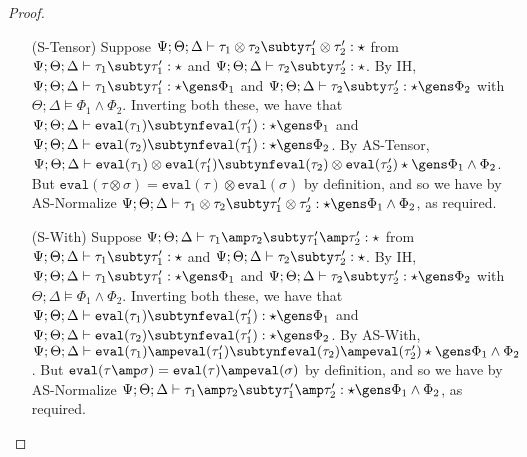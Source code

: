 \begin{proof}
\begin{itemize}
   \item[(S-Tensor)] Suppose $\Psi ; \Theta ; \Delta \vdash \tau_1 \otimes \tau_2 \subty \tau_1' \otimes \tau_2' : \star$ from $\Psi ; \Theta ; \Delta \vdash \tau_1 \subty \tau_1' : \star$ and $\Psi ; \Theta ; \Delta \vdash \tau_2 \subty \tau_2' : \star$. By IH, $\Psi ; \Theta ; \Delta \vdash \tau_1 \subty \tau_1' : \star \gens \Phi_1$ and $\Psi ; \Theta ; \Delta \vdash \tau_2 \subty \tau_2' : \star \gens \Phi_2$ with $\Theta ; \Delta \vDash \Phi_1 \wedge \Phi_2$. Inverting both these, we have that $\Psi ; \Theta ; \Delta \vdash \texttt{eval}(\tau_1) \subtynf \texttt{eval}(\tau_1') : \star \gens \Phi_1$ and $\Psi ; \Theta ; \Delta \vdash \texttt{eval}(\tau_2) \subtynf \texttt{eval}(\tau_1') : \star \gens \Phi_2$. By AS-Tensor, $\Psi ; \Theta ; \Delta \vdash \texttt{eval}(\tau_1) \otimes \texttt{eval}(\tau_1') \subtynf \texttt{eval}(\tau_2) \otimes \texttt{eval}(\tau_2') \star \gens \Phi_1 \wedge \Phi_2$. But $\texttt{eval}(\tau \otimes \sigma) = \texttt{eval}(\tau)\otimes\texttt{eval}(\sigma)$ by definition, and so we have by AS-Normalize $\Psi ; \Theta ; \Delta \vdash \tau_1 \otimes \tau_2 \subty \tau_1' \otimes \tau_2' : \star \gens \Phi_1 \wedge \Phi_2$, as required.
   \item[(S-With)] Suppose $\Psi ; \Theta ; \Delta \vdash \tau_1 \amp \tau_2 \subty \tau_1' \amp \tau_2' : \star$ from $\Psi ; \Theta ; \Delta \vdash \tau_1 \subty \tau_1' : \star$ and $\Psi ; \Theta ; \Delta \vdash \tau_2 \subty \tau_2' : \star$. By IH, $\Psi ; \Theta ; \Delta \vdash \tau_1 \subty \tau_1' : \star \gens \Phi_1$ and $\Psi ; \Theta ; \Delta \vdash \tau_2 \subty \tau_2' : \star \gens \Phi_2$ with $\Theta ; \Delta \vDash \Phi_1 \wedge \Phi_2$. Inverting both these, we have that $\Psi ; \Theta ; \Delta \vdash \texttt{eval}(\tau_1) \subtynf \texttt{eval}(\tau_1') : \star \gens \Phi_1$ and $\Psi ; \Theta ; \Delta \vdash \texttt{eval}(\tau_2) \subtynf \texttt{eval}(\tau_1') : \star \gens \Phi_2$. By AS-With, $\Psi ; \Theta ; \Delta \vdash \texttt{eval}(\tau_1) \amp \texttt{eval}(\tau_1') \subtynf \texttt{eval}(\tau_2) \amp \texttt{eval}(\tau_2') \star \gens \Phi_1 \wedge \Phi_2$. But $\texttt{eval}(\tau \amp \sigma) = \texttt{eval}(\tau)\amp\texttt{eval}(\sigma)$ by definition, and so we have by AS-Normalize $\Psi ; \Theta ; \Delta \vdash \tau_1 \amp \tau_2 \subty \tau_1' \amp \tau_2' : \star \gens \Phi_1 \wedge \Phi_2$, as required.

\end{itemize}
\end{proof}

